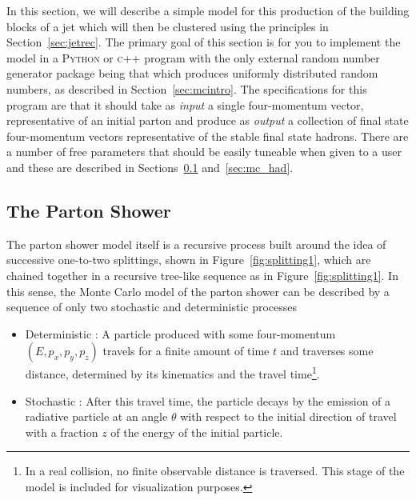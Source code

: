 \documentclass[UKenglish,texlive=2016]{\ATLASLATEXPATH atlasdoc}
\begin{document}
In this section, we will describe a simple model for this production of the building blocks of a jet which will then be clustered using the principles in Section~\ref{sec:jetrec}.  The primary goal of this section is for you to implement the model in a \textsc{Python} or \textsc{c++} program with the only external random number generator package being that which produces uniformly distributed random numbers, as described in Section~\ref{sec:mcintro}.  The specifications for this program are that it should take as \textit{input} a single four-momentum vector, representative of an initial parton and produce as \textit{output} a collection of final state four-momentum vectors representative of the stable final state hadrons.  There are a number of free parameters that should be easily tuneable when given to a user and these are described in Sections~\ref{sec:mc_ps} and~\ref{sec:mc_had}.

\subsection{The Parton Shower}
\label{sec:mc_ps}
The parton shower model itself is a recursive process built around the idea of successive one-to-two splittings, shown in Figure~\ref{fig:splitting1}, which are chained together in a recursive tree-like sequence as in Figure~\ref{fig:splitting1}.  In this sense, the Monte Carlo model of the parton shower can be described by a sequence of only two stochastic and deterministic processes

\begin{itemize}
\item Deterministic : A particle produced with some four-momentum $(E,p_x,p_y,p_z)$ travels for a finite amount of time $t$ and traverses some distance, determined by its kinematics and the travel time\footnote{In a real collision, no finite observable distance is traversed.  This stage of the model is included for visualization purposes.}.
\item Stochastic : After this travel time, the particle decays by the emission of a radiative particle at an angle $\theta$ with respect to the initial direction of travel with a fraction $z$ of the energy of the initial particle.  
\end{itemize}
\end{document}
